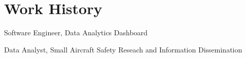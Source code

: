 \documentclass[letterpaper]{resume}
\begin{document}

\section{Work History}

\begin{compactitem}[\null]
\item Software Engineer, Data Analytics Dashboard
\end{compactitem}

\begin{compactitem}[\null]
\item Data Analyst, Small Aircraft Safety Reseach and Information Dissemination
\end{compactitem}
\end{document}
